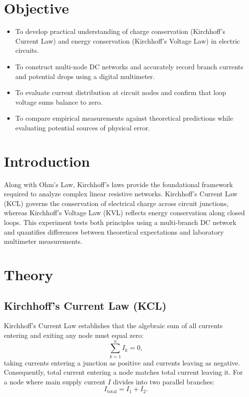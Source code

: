 \section{Objective}
\begin{itemize}
	\item To develop practical understanding of charge conservation (Kirchhoff's Current Law) and energy conservation (Kirchhoff's Voltage Law) in electric circuits.
	\item To construct multi-node DC networks and accurately record branch currents and potential drops using a digital multimeter.
	\item To evaluate current distribution at circuit nodes and confirm that loop voltage sums balance to zero.
	\item To compare empirical measurements against theoretical predictions while evaluating potential sources of physical error.
\end{itemize}

\section{Introduction}
Along with Ohm's Law, Kirchhoff's laws provide the foundational framework required to analyze complex linear resistive networks. Kirchhoff's Current Law (KCL) governs the conservation of electrical charge across circuit junctions, whereas Kirchhoff's Voltage Law (KVL) reflects energy conservation along closed loops. This experiment tests both principles using a multi-branch DC network and quantifies differences between theoretical expectations and laboratory multimeter measurements.

\section{Theory}

\subsection{Kirchhoff's Current Law (KCL)}
Kirchhoff's Current Law establishes that the algebraic sum of all currents entering and exiting any node must equal zero:
\[
\sum_{k=1}^{n} I_k = 0,
\]
taking currents entering a junction as positive and currents leaving as negative. Consequently, total current entering a node matches total current leaving it. For a node where main supply current $I$ divides into two parallel branches:
\[
I_{\text{total}} = I_1 + I_2.
\]

